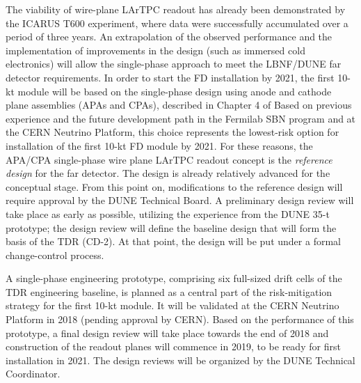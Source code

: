 The viability of wire-plane LArTPC readout has already been demonstrated by the ICARUS T600 
experiment, where data were successfully accumulated over a period of three years. 
An extrapolation of the observed performance and the implementation of improvements 
in the design (such as immersed cold electronics) will allow the single-phase 
approach to meet the LBNF/DUNE far detector requirements. In order to start the FD installation
by 2021, %
the first 10-kt module will be based on the single-phase design using anode and cathode
plane assemblies (APAs and CPAs), described in Chapter 4 of %
Based on previous experience and the 
future development path in the Fermilab SBN program and at the CERN Neutrino Platform, 
this choice represents the lowest-risk option for installation of the first 10-kt FD module by 
2021. %
For these reasons, the APA/CPA single-phase wire plane LArTPC readout 
concept %
is the \textit{reference design} 
for the far detector. 
The design is already relatively advanced for the conceptual  
stage. From this point on, modifications to the reference design will require approval
by the DUNE Technical Board. A preliminary design review will take place as early 
as possible, utilizing the experience from the DUNE 35-t prototype; the design 
review will define the baseline design that will form the basis of the TDR (CD-2). 
At that point, the design will be put under a formal change-control 
process. 

A single-phase engineering prototype,
comprising six full-sized drift cells of the TDR engineering baseline,
is planned as a central part of the risk-mitigation 
strategy for the first 10-kt module. It
will be validated at the CERN Neutrino Platform in 2018 (pending approval by CERN). 
%
Based on the  performance of this prototype, %
a final design review will take place towards the end of 2018 and construction of the readout planes will 
commence in 2019, to be ready for first installation in 2021. %
The design reviews will be organized by the DUNE Technical Coordinator. 

